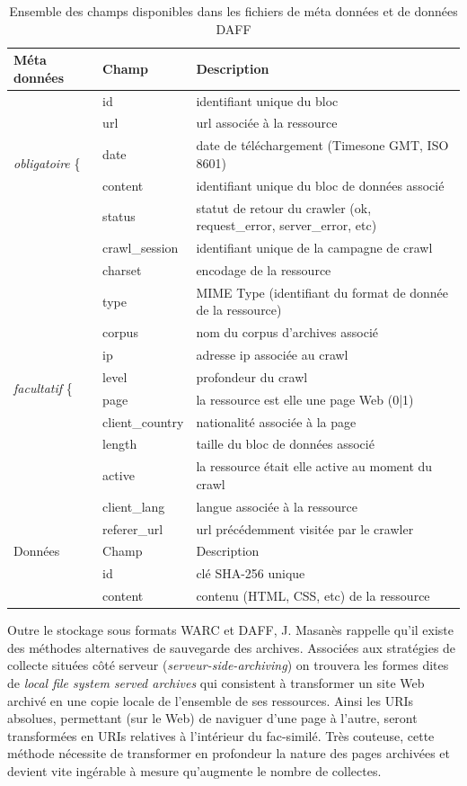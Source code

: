 \documentclass[symmetric,justified,marginals=raggedouter]{tufte-book}
\makeatletter
\newcommand{\vastt}{\bBigg@{4}}
\newcommand{\Vastt}{\bBigg@{11}}
\makeatother
\begin{document}
\begin{table}
  \label{tab:daff}
  \begin{tabular}{lll}
    \toprule
    Méta données& Champ & Description\\
    \midrule  
    \multirow{5}{*}{\emph{obligatoire} \vastt\{ }&id&identifiant unique du bloc\\
    &url&url associée à la ressource\\
    &date&date de téléchargement (Timesone GMT, ISO 8601)\\
    &content&identifiant unique du bloc de données associé\\     
    &status&statut de retour du crawler (ok, request\_error, server\_error, etc)\\
    \midrule     
    \multirow{12}{*}{\emph{facultatif  } \Vastt\{ }&crawl\_session&identifiant unique de la campagne de crawl\\
    &charset&encodage de la ressource\\
    &type&MIME Type (identifiant du format de donnée de la ressource)\\
    &corpus&nom du corpus d'archives associé\\
    &ip&adresse ip associée au crawl\\
    &level&profondeur du crawl\\
    &page&la ressource est elle une page Web (0|1)\\
    &client\_country&nationalité associée à la page\\
    &length&taille du bloc de données associé\\
	&active&la ressource était elle active au moment du crawl\\
	&client\_lang&langue associée à la ressource\\
	&referer\_url&url précédemment visitée par le crawler\\
    \midrule
    Données& Champ & Description\\
    \midrule 
    &id&clé SHA-256 unique\\
    &content&contenu (HTML, CSS, etc) de la ressource\\    	
    \bottomrule
\end{tabular}
  \bigskip
  \caption{Ensemble des champs disponibles dans les fichiers de méta données et de données DAFF}
\end{table} 

\noindent Outre le stockage sous formats WARC et DAFF, J. Masanès \citep{masanes_web_2006} rappelle qu'il existe des méthodes alternatives de sauvegarde des archives. Associées aux stratégies de collecte situées côté serveur (\textit{serveur-side-archiving}) on trouvera les formes dites de \textit{local file system served archives} qui consistent à transformer un site Web archivé en une copie locale de l'ensemble de ses ressources. Ainsi les URIs absolues, permettant (sur le Web) de naviguer d'une page à l'autre, seront transformées en URIs relatives à l'intérieur du fac-similé. Très couteuse, cette méthode nécessite de transformer en profondeur la nature des pages archivées et devient vite ingérable à mesure qu'augmente le nombre de collectes.
\end{document}

